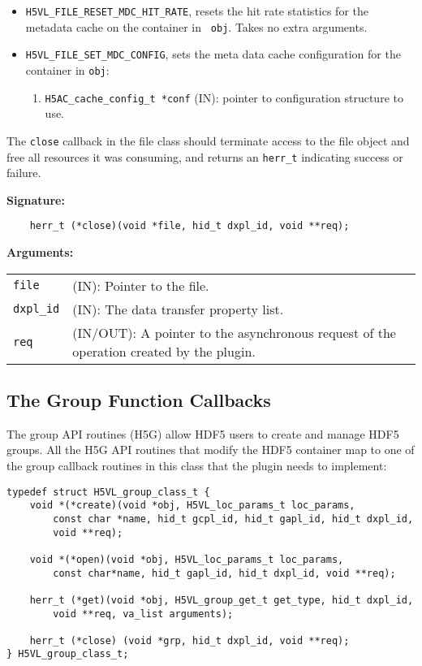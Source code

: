 \begin{itemize}
\item {\tt H5VL\_FILE\_RESET\_MDC\_HIT\_RATE}, resets the hit rate
  statistics for the metadata cache on the container in {\tt
    obj}. Takes no extra arguments.

\item {\tt H5VL\_FILE\_SET\_MDC\_CONFIG}, sets the meta data cache
  configuration for the container in {\tt obj}:
  \begin{enumerate}
  \item {\tt H5AC\_cache\_config\_t *conf} (IN): pointer to
    configuration structure to use.
  \end{enumerate}

\end{itemize}

The {\tt close} callback in the file class should terminate access to
the file object and free all resources it was consuming, and returns
an {\tt herr\_t} indicating success or failure.

\textbf{Signature:}
\begin{lstlisting}
    herr_t (*close)(void *file, hid_t dxpl_id, void **req);
\end{lstlisting}

\textbf{Arguments:}\\
\begin{tabular}{l p{10cm}}
  {\tt file} & (IN): Pointer to the file.\\
  {\tt dxpl\_id} & (IN): The data transfer property list.\\
  {\tt req} & (IN/OUT): A pointer to the asynchronous request of the
  operation created by the plugin.\\
\end{tabular}

\subsection{The Group Function Callbacks}
The group API routines (H5G) allow HDF5 users to create and manage
HDF5 groups. All the H5G API routines that modify the HDF5 container
map to one of the group callback routines in this class that the
plugin needs to implement:

\begin{lstlisting}
typedef struct H5VL_group_class_t {
    void *(*create)(void *obj, H5VL_loc_params_t loc_params, 
        const char *name, hid_t gcpl_id, hid_t gapl_id, hid_t dxpl_id, 
        void **req);

    void *(*open)(void *obj, H5VL_loc_params_t loc_params, 
        const char*name, hid_t gapl_id, hid_t dxpl_id, void **req);

    herr_t (*get)(void *obj, H5VL_group_get_t get_type, hid_t dxpl_id, 
        void **req, va_list arguments);

    herr_t (*close) (void *grp, hid_t dxpl_id, void **req);
} H5VL_group_class_t;
\end{lstlisting}

